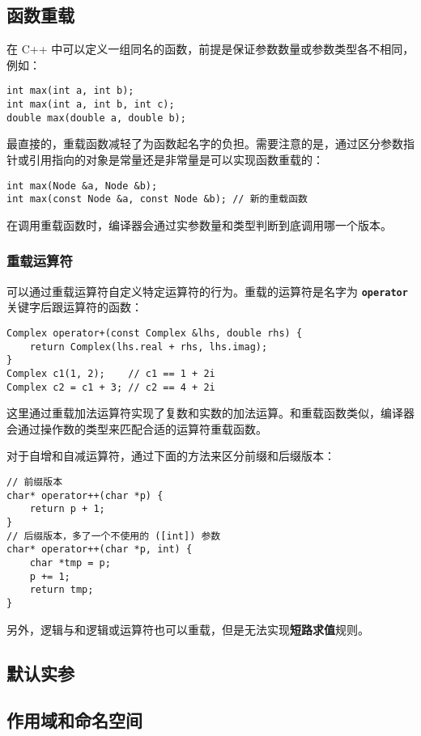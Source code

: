 \documentclass[hyperref,UTF8]{article}
\begin{document}
\subsection{函数重载}

在 C++ 中可以定义一组同名的函数，前提是保证参数数量或参数类型各不相同，例如：
\begin{lstlisting}
int max(int a, int b);
int max(int a, int b, int c);
double max(double a, double b);
\end{lstlisting}
最直接的，重载函数减轻了为函数起名字的负担。需要注意的是，通过区分参数指针或引用指向的对象是常量还是非常量是可以实现函数重载的：
\begin{lstlisting}
int max(Node &a, Node &b);
int max(const Node &a, const Node &b); // 新的重载函数
\end{lstlisting}

在调用重载函数时，编译器会通过实参数量和类型判断到底调用哪一个版本。

\subsubsection{重载运算符} \label{sec:overloaded_operator}

可以通过重载运算符自定义特定运算符的行为。重载的运算符是名字为 \textbf{\texttt{operator}} 关键字后跟运算符的函数：
\begin{lstlisting}
Complex operator+(const Complex &lhs, double rhs) {
    return Complex(lhs.real + rhs, lhs.imag);
}
Complex c1(1, 2);    // c1 == 1 + 2i
Complex c2 = c1 + 3; // c2 == 4 + 2i
\end{lstlisting}
这里通过重载加法运算符实现了复数和实数的加法运算。和重载函数类似，编译器会通过操作数的类型来匹配合适的运算符重载函数。

对于自增和自减运算符，通过下面的方法来区分前缀和后缀版本：
\begin{lstlisting}
// 前缀版本
char* operator++(char *p) {
    return p + 1;
}
// 后缀版本，多了一个不使用的 ([int]) 参数
char* operator++(char *p, int) {
    char *tmp = p;
    p += 1;
    return tmp;
}
\end{lstlisting}
另外，逻辑与和逻辑或运算符也可以重载，但是无法实现\textbf{短路求值}规则。

\subsection{默认实参}

\subsection{作用域和命名空间} \label{sec:scope}
\end{document}
